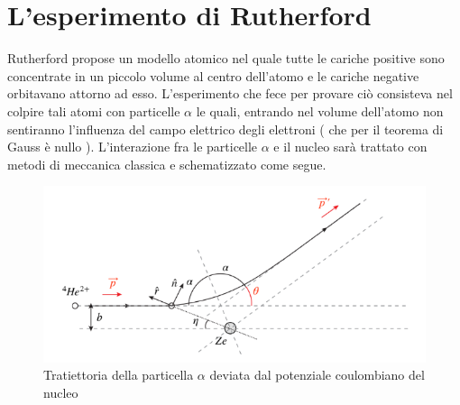 \chapter{L'esperimento di Rutherford}
Rutherford propose un modello atomico nel quale tutte le cariche positive sono concentrate 
in un piccolo volume al centro dell'atomo e le cariche negative orbitavano attorno ad esso.
L'esperimento che fece per provare ciò consisteva nel colpire tali atomi con particelle 
$\alpha$ le quali, entrando nel volume dell'atomo non sentiranno l'influenza del campo elettrico 
degli elettroni ( che per il teorema di Gauss è nullo ).
L'interazione fra le particelle $\alpha$ e il nucleo sarà trattato con metodi di meccanica 
classica e schematizzato come segue.
\begin{figure}[!h]
    \centering
    \includegraphics[scale=0.5]{ch5Ratherford/Rutherford}
    \caption{Tratiettoria della particella $\alpha$ deviata dal potenziale coulombiano del nucleo}
\end{figure}


